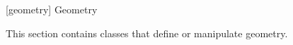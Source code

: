 
 [geometry] {Geometry}

\pnum
This section contains classes that define or manipulate geometry.

\addtocounter{SectionDepthBase}{1}




\addtocounter{SectionDepthBase}{-1}
